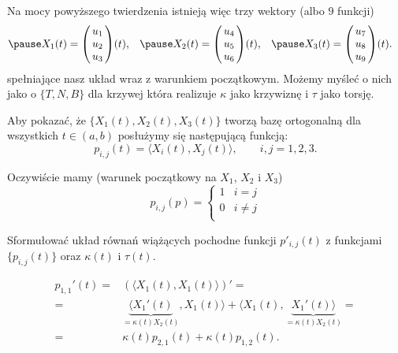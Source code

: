 \begin{frame}[<+->]
Na mocy powyższego twierdzenia istnieją więc trzy wektory (albo $9$ funkcji) 
\begin{align*}
\pause X_1(t)&=\left(\!\!\begin{array}{c}
u_1\\u_2\\u_3
\end{array}\!\!\right)\!(t),&
\pause X_2(t)&=\left(\!\!\begin{array}{c}
u_4\\u_5\\u_6
\end{array}\!\!\right)\!(t),&
\pause X_3(t)&=\left(\!\!\begin{array}{c}
u_7\\u_8\\u_9
\end{array}\!\!\right)\!(t).
\end{align*}
spełniające nasz układ wraz z warunkiem początkowym. \pause Możemy myśleć o nich jako o $\{T,N,B\}$ dla krzywej która realizuje $\kappa$ jako krzywiznę i $\tau$ jako torsję.

\pause Aby pokazać, że $\{X_1(t),X_2(t),X_3(t)\}$ tworzą bazę ortogonalną dla wszystkich $t\in (a,b)$ posłużymy się następującą funkcją: \[p_{i,j}(t)=\langle X_i(t),X_j(t)\rangle, \qquad i,j=1,2,3.\]

\pause Oczywiście mamy (warunek początkowy na $X_1$, $X_2$ i $X_3$)
\begin{equation}\label{eqn:initial-cond}
p_{i,j}(p)=
\begin{cases}
1 & i=j\\
0 & i\neq j\\
\end{cases}
\end{equation}
\end{frame}
\begin{frame}[<+->]
\begin{exercise}
Sformułować układ równań wiążących pochodne funkcji $p'_{i,j}(t)$ z funkcjami $\{p_{i,j}(t)\}$ oraz $\kappa(t)$ i $\tau(t)$.
\end{exercise}

\begin{przyklad}
\[\begin{split}
p_{1,1}'(t)=&\left(\langle X_1(t),X_1(t)\rangle\right)'=\\
=&\underbrace{\langle X_1'(t)}_{=\kappa(t)X_2(t)},X_1(t)\rangle+\langle X_1(t),\underbrace{X_1'(t)\rangle}_{=\kappa(t) X_2(t)}=\\=&\kappa(t) p_{2,1}(t)+\kappa(t)p_{1,2}(t).
\end{split}
\]
\end{przyklad}

\end{frame}
